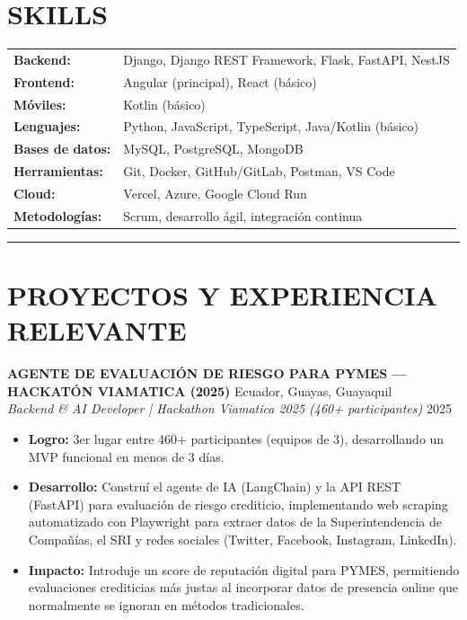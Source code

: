 \documentclass[11pt, a4paper]{article}
\begin{document}
\section*{SKILLS}
\vspace{-2pt}
\begin{tabular}{p{} p{}}
\textbf{Backend:} & Django, Django REST Framework, Flask, FastAPI, NestJS \\
\textbf{Frontend:} & Angular (principal), React (básico) \\
\textbf{Móviles:} & Kotlin (básico) \\
\textbf{Lenguajes:} & Python, JavaScript, TypeScript, Java/Kotlin (básico) \\
\textbf{Bases de datos:} & MySQL, PostgreSQL, MongoDB \\
\textbf{Herramientas:} & Git, Docker, GitHub/GitLab, Postman, VS Code \\
\textbf{Cloud:} & Vercel, Azure, Google Cloud Run \\
\textbf{Metodologías:} & Scrum, desarrollo ágil, integración continua \\
\end{tabular}
\vspace{6pt}
\hrule
\vspace{8pt}

\section*{PROYECTOS Y EXPERIENCIA RELEVANTE}

\textbf{AGENTE DE EVALUACIÓN DE RIESGO PARA PYMES --- HACKATÓN VIAMATICA (2025)} \hfill Ecuador, Guayas, Guayaquil \\
\textit{Backend \& AI Developer | Hackathon Viamatica 2025 (460+ participantes)} \hfill 2025

\begin{itemize}
\item \textbf{Logro:} 3er lugar entre 460+ participantes (equipos de 3), desarrollando un MVP funcional en menos de 3 días.
\item \textbf{Desarrollo:} Construí el agente de IA (LangChain) y la API REST (FastAPI) para evaluación de riesgo crediticio, implementando web scraping automatizado con Playwright para extraer datos de la Superintendencia de Compañías, el SRI y redes sociales (Twitter, Facebook, Instagram, LinkedIn).
\item \textbf{Impacto:} Introduje un score de reputación digital para PYMES, permitiendo evaluaciones crediticias más justas al incorporar datos de presencia online que normalmente se ignoran en métodos tradicionales.
\end{itemize}
\end{document}
